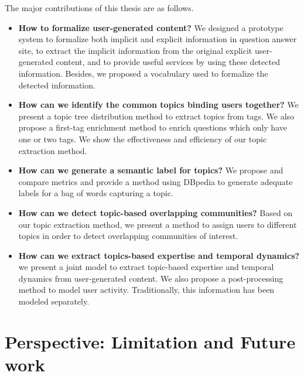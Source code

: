 The major contributions of this thesis are as follows.
\begin{itemize}
\item{\textbf{How to formalize user-generated content?} We designed a prototype system to formalize both implicit and explicit information in question answer site, to extract the implicit information from the original explicit user-generated content, and to provide useful services by using these detected information. Besides, we proposed a vocabulary used to formalize the detected information.}

\item{\textbf{How can we identify the common topics binding users together?} We present a topic tree distribution method to extract topics from tags. We also propose a first-tag enrichment method to enrich questions which only have one or two tags. We show the effectiveness and efficiency of our topic extraction method.}

\item{\textbf{How can we generate a semantic label for topics?} We propose and compare metrics and provide a method using DBpedia to generate adequate labels for a bag of words capturing a topic.}

\item{\textbf{How can we detect topic-based overlapping communities?} Based on our topic extraction method, we present a method to assign users to different topics in order to detect overlapping communities of interest.}

\item{\textbf{How can we extract topics-based expertise and temporal dynamics?} we present a joint model to extract topic-based expertise and temporal dynamics from user-generated content. We also propose a post-processing method to model user activity. Traditionally, this information has been modeled separately.}

\end{itemize}



\section{Perspective: Limitation and Future work}

